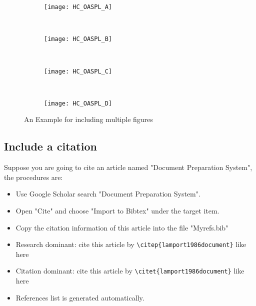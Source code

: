 \begin{figure}[!htbp]
    \centering
    \begin{subfigure}[b]{\MySubFactor\textwidth}
        \texttt{[image: HC\_OASPL\_A]}
        \caption{}
        \label{fig:HC_OASPL_A}
    \end{subfigure}%
    ~%
    \begin{subfigure}[b]{\MySubFactor\textwidth}
        \texttt{[image: HC\_OASPL\_B]}
        \caption{}
        \label{fig:HC_OASPL_B}
    \end{subfigure}%
    \\%
    \begin{subfigure}[b]{\MySubFactor\textwidth}
        \texttt{[image: HC\_OASPL\_C]}
        \caption{}
        \label{fig:HC_OASPL_C}
    \end{subfigure}%
    ~%
    \begin{subfigure}[b]{\MySubFactor\textwidth}
        \texttt{[image: HC\_OASPL\_D]}
        \caption{}
        \label{fig:HC_OASPL_D}
    \end{subfigure}%
    \caption{An Example for including multiple figures}
    \label{fig:HC_OASPL}
\end{figure}

\subsection{Include a citation} %
Suppose you are going to cite an article named "Document Preparation System", the procedures are:
\begin{itemize}
    \item Use Google Scholar search "Document Preparation System".
    \item Open "Cite" and choose "Import to Bibtex" under the target item.
    \item Copy the citation information of this article into the file "Myrefs.bib"
    \item Research dominant: cite this article by \verb+\citep{lamport1986document}+ like here \citep{lamport1986document}
    \item Citation dominant: cite this article by \verb+\citet{lamport1986document}+ like here \citet{lamport1986document}
    \item References list is generated automatically.
\end{itemize}

